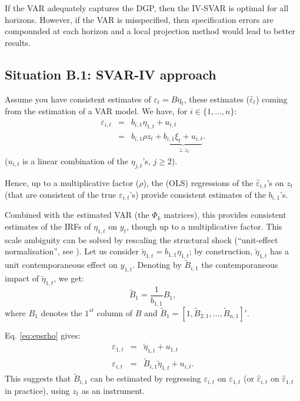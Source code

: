 \documentclass[
  12pt,
]{book}
\theoremstyle{definition}
\theoremstyle{definition}
\theoremstyle{definition}
\theoremstyle{definition}
\theoremstyle{remark}
\begin{document}
If the VAR adequately captures the DGP, then the IV-SVAR is optimal for all horizons. However, if the VAR is misspecified, then specification errors are compounded at each horizon and a local projection method would lead to better results.

\hypertarget{SVARIVa}{%
\subsection{Situation B.1: SVAR-IV approach}\label{SVARIVa}}

Assume you have consistent estimates of \(\varepsilon_t = B\eta_t\), these estimates (\(\hat\varepsilon_{t}\)) coming from the estimation of a VAR model. We have, for \(i \in \{1,\dots,n\}\):
\begin{eqnarray}
\varepsilon_{i,t} &=& b_{i,1} \eta_{1,t} + u_{i,t} \label{eq:epsrho}\\
&=& b_{i,1} \rho z_t + \underbrace{b_{i,1}\xi_t + u_{i,t}}_{\perp z_t}. \nonumber
\end{eqnarray}
(\(u_{i,t}\) is a linear combination of the \(\eta_{j,t}\)'s, \(j\ge2\)).

Hence, up to a multiplicative factor (\(\rho\)), the (OLS) regressions of the \(\hat\varepsilon_{i,t}\)'s on \(z_t\) (that are consistent of the true \(\varepsilon_{i,t}\)'s) provide consistent estimates of the \(b_{i,1}\)'s.

Combined with the estimated VAR (the \(\Phi_k\) matrices), this provides consistent estimates of the IRFs of \(\eta_{1,t}\) on \(y_t\), though up to a multiplicative factor. This scale ambiguity can be solved by rescaling the structural shock (``unit-effect normalisation'', see \citet{Stock_Watson_2018}). Let us consider \(\tilde\eta_{1,t}=b_{1,1}\eta_{1,t}\); by construction, \(\tilde\eta_{1,t}\) has a unit contemporaneous effect on \(y_{1,t}\). Denoting by \(\tilde{B}_{i,1}\) the contemporaneous impact of \(\tilde\eta_{1,t}\), we get:
\[
\tilde{B}_{1} = \frac{1}{b_{1,1}} {B}_{1},
\]
where \(B_{1}\) denotes the \(1^{st}\) column of \(B\) and \(\tilde{B}_{1}=[1,\tilde{B}_{2,1},\dots,\tilde{B}_{n,1}]'\).

Eq. \eqref{eq:epsrho} gives:
\begin{eqnarray*}
\varepsilon_{1,t} &=& \tilde\eta_{1,t} + u_{1,t}\\
\varepsilon_{i,t} &=& \tilde{B}_{i,1} \tilde\eta_{1,t} + u_{i,t}.
\end{eqnarray*}
This suggests that \(\tilde{B}_{i,1}\) can be estimated by regressing \(\varepsilon_{i,t}\) on \(\varepsilon_{1,t}\) (or \(\hat\varepsilon_{i,t}\) on \(\hat\varepsilon_{1,t}\) in practice), using \(z_t\) as an instrument.
\end{document}
